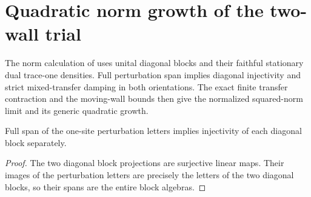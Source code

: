 \section{Quadratic norm growth of the two-wall trial}
\label{sec:uncle_trial_norm_growth}

The norm calculation of
\cite[low-energy-state lemma]{FernandezGonzalez2015Uncle}
uses unital diagonal blocks and their faithful stationary dual trace-one
densities. Full perturbation span implies diagonal injectivity and strict
mixed-transfer damping in both orientations. The exact finite transfer
contraction and the moving-wall bounds then give the normalized squared-norm
limit and its generic quadratic growth.

\begin{lemma}
    \label{lem:uncle_diagonal_injectivity}
    \leanok
    Full span of the one-site perturbation letters implies injectivity
    of each diagonal block separately.
\end{lemma}
\begin{proof}
    \leanok
    The two diagonal block projections are surjective linear maps. Their
    images of the perturbation letters are precisely the letters of the
    two diagonal blocks, so their spans are the entire block algebras.
\end{proof}

